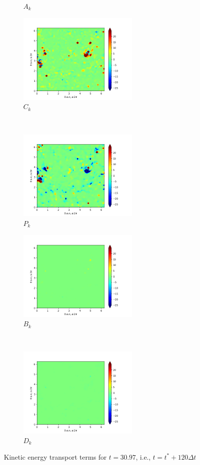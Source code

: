 \begin{figure}[H]
\begin{subfigure}{0.45\textwidth}
        \caption{$A_{k}$}
    \end{subfigure}
    \newline
    \begin{subfigure}{0.45\textwidth}
        \includegraphics[height=1.75in]{media/run-cds-65/C-ke-1460.png}
        \caption{$C_{k}$}
    \end{subfigure}
    ~
    \begin{subfigure}{0.45\textwidth}
        \includegraphics[height=1.75in]{media/run-cds-65/P-ke-1460.png}
        \caption{$P_{k}$}
    \end{subfigure}
    \newline
    \begin{subfigure}{0.45\textwidth}
        \includegraphics[height=1.75in]{media/run-cds-65/B-ke-1460.png}
        \caption{$B_{k}$}
    \end{subfigure}
    ~
    \begin{subfigure}{0.45\textwidth}
        \includegraphics[height=1.75in]{media/run-cds-65/D-ke-1460.png}
        \caption{$D_{k}$}
    \end{subfigure}
    \caption{Kinetic energy transport terms for $t=30.97$, i.e., $t=t^{\ast} + 120 \Delta t$}
\end{figure}
